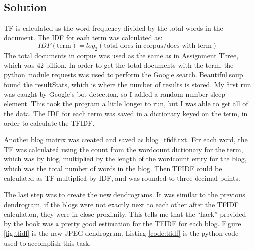 \documentclass[paper=a4, fontsize=11pt]{scrartcl} %
\numberwithin{equation}{section} %
\numberwithin{figure}{section} %
\numberwithin{table}{section} %
\begin{document}
\subsection{Solution}
TF is calculated as the word frequency divided by the total words in the document.
The IDF for each term was calculated as:
\[
IDF(\textrm{term})  = log_2(\textrm{total docs in corpus} / \textrm{docs with term})
\]
The total documents in corpus was used as the same as in Assignment Three, which was 42 billion.
In order to get the total documents with the term, the python module requests was used to perform the Google search.
Beautiful soup found the resultStats, which is where the number of results is stored.
My first run was caught by Google's bot detection, so I added a random number sleep element.
This took the program a little longer to run, but I was able to get all of the data.
The IDF for each term was saved in a dictionary keyed on the term, in order to calculate the TFIDF.

Another blog matrix was created and saved as blog\_tfidf.txt.
For each word, the TF was calculated using the count from the wordcount dictionary for the term, which was by blog, multiplied by the length of the wordcount entry for the blog, which was the total number of words in the blog.
Then TFIDF could be calculated as TF multiplied by IDF, and was rounded to three decimal points. \cite{bib:pyfunctions}

The last step was to create the new dendrograms.
It was similar to the previous dendrogram, if the blogs were not exactly next to each other after the TFIDF calculation, they were in close proximity.
This tells me that the ``hack'' provided by the book was a pretty good estimation for the TFIDF for each blog.
Figure \ref{fig:tfidf} is the new JPEG dendrogram.
Listing \ref{code:tfidf} is the python code used to accomplish this task.


\end{document}
